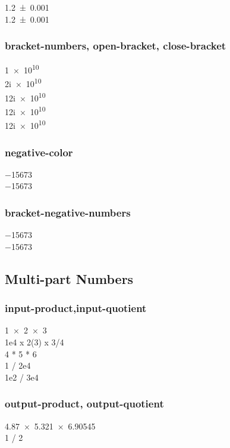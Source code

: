 \documentclass{article}
\begin{document}
\num{1.2 +- 0.001}\\
\num[separate-uncertainty]{1.2 +- 0.001}\\

\subsubsection{bracket-numbers, open-bracket, close-bracket}
{
\num{1 e10} \\
\num{2i e10} \\
\num{1+2i e10} \\
\num[bracket-numbers = false]{1+2i e10} \\
\num{1+2i e10}\\
}

\subsubsection{negative-color}
\num{-15673} \\
\num[negative-color = red]{-15673}

\subsubsection{bracket-negative-numbers}
\num{-15673} \\
\num[bracket-negative-numbers]{-15673} \\

\subsection{Multi-part Numbers}

\subsubsection{input-product,input-quotient}
\num{1 x 2 x 3} \\
\num{1e4 x 2(3) x 3/4} \\
\num[input-product=*]{4 * 5 * 6} \\
\num{ 1 / 2e4 } \\
\num{ 1e2 / 3e4 }\\

\subsubsection{output-product, output-quotient}
\num[output-product = \cdot]{4.87 x 5.321 x 6.90545} \\
\num[output-quotient = \text{ div }]{1 / 2}\\
\end{document}
